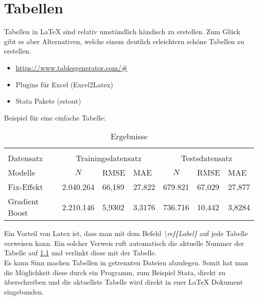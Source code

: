 
\chapter{Tabellen}
Tabellen in LaTeX sind relativ umständlich händisch zu erstellen. Zum Glück gibt es aber Alternativen, welche einem deutlich erleichtern schöne Tabellen zu erstellen.
\begin{itemize}
    \item \url{https://www.tablesgenerator.com/#}
    \item Plugins für Excel (Excel2Latex)
    \item Stata Pakete (estout)
\end{itemize}

Beispiel für eine einfache Tabelle:
\begin{table}[h]
\centering
\caption{Ergebnisse}
\label{tab:easy_table}
\begin{tabular}{l|lll|lll}
\hline\hline \multicolumn{4}{l}{} \\ [-10pt]
Datensatz & \multicolumn{3}{c|}{Trainingsdatensatz} & \multicolumn{3}{c}{Testsdatensatz} \\
Modelle &                \multicolumn{1}{c}{ $N$} &     RMSE &      MAE &           \multicolumn{1}{c}{ $N$}&      RMSE &      MAE \\
\midrule
Fix-Effekt              &           2.040.264 & 66,189     &     27,822 &    679.821 & 67,029 & 27,877 \\
Gradient Boost    &           2.210.146 & 5,9302     &     3,3176 &    736.716 & 10,442 &  3,8284 \\
\hline\hline 
\end{tabular}

\end{table}

Ein Vorteil von Latex ist, dass man mit dem Befehl \emph{ \textbackslash ref\{Label\} } auf jede Tabelle verweisen kann. Ein solcher Verweis ruft automatisch die aktuelle Nummer der Tabelle auf \ref{tab:easy_table} und verlinkt diese mit der Tabelle.\\
Es kann Sinn machen Tabellen in getrennten Dateien abzulegen. Somit hat man die Möglichkeit diese durch ein Programm, zum Beispiel Stata, direkt zu überschreiben und die aktuellste Tabelle wird direkt in euer LaTeX Dokument eingebunden.
